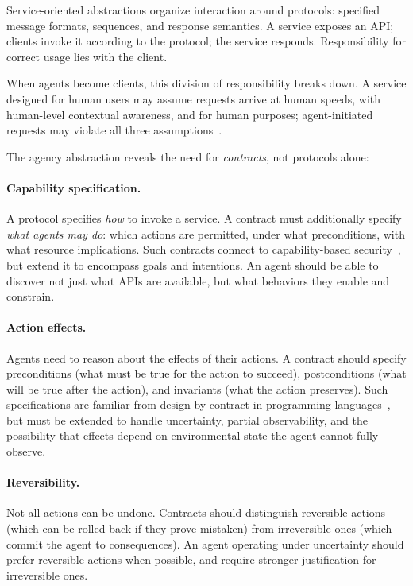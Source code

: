 \documentclass[11pt]{article}
\begin{document}
Service-oriented abstractions organize interaction around protocols: specified message formats, sequences, and response semantics. A service exposes an API; clients invoke it according to the protocol; the service responds. Responsibility for correct usage lies with the client.

When agents become clients, this division of responsibility breaks down. A service designed for human users may assume requests arrive at human speeds, with human-level contextual awareness, and for human purposes; agent-initiated requests may violate all three assumptions~\cite{visibility_agents}.

The agency abstraction reveals the need for \textit{contracts}, not protocols alone:

\paragraph{Capability specification.} A protocol specifies \textit{how} to invoke a service. A contract must additionally specify \textit{what agents may do}: which actions are permitted, under what preconditions, with what resource implications. Such contracts connect to capability-based security~\cite{dennis_capabilities}, but extend it to encompass goals and intentions. An agent should be able to discover not just what APIs are available, but what behaviors they enable and constrain.

\paragraph{Action effects.} Agents need to reason about the effects of their actions. A contract should specify preconditions (what must be true for the action to succeed), postconditions (what will be true after the action), and invariants (what the action preserves). Such specifications are familiar from design-by-contract in programming languages~\cite{meyer_contract}, but must be extended to handle uncertainty, partial observability, and the possibility that effects depend on environmental state the agent cannot fully observe.

\paragraph{Reversibility.} Not all actions can be undone. Contracts should distinguish reversible actions (which can be rolled back if they prove mistaken) from irreversible ones (which commit the agent to consequences). An agent operating under uncertainty should prefer reversible actions when possible, and require stronger justification for irreversible ones.
\end{document}
